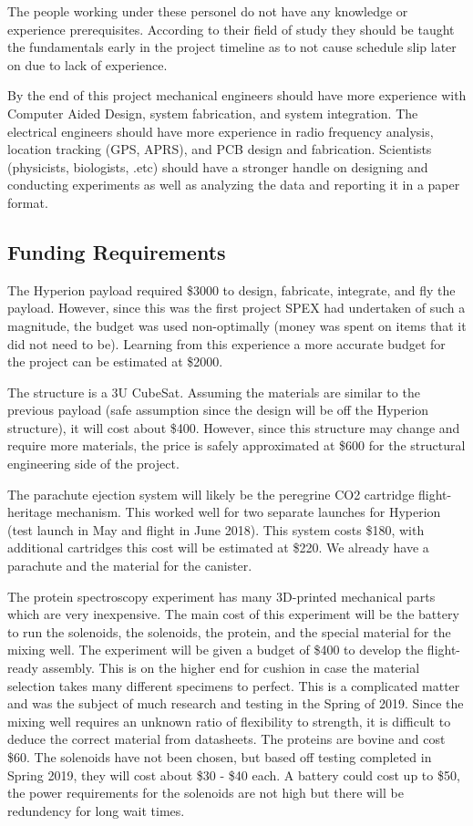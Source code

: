 \documentclass[conference]{IEEEtran} %
\begin{document}
The people working under these personel do not have any knowledge or experience prerequisites. According to their field of study they should be taught the fundamentals early in the project 
timeline as to not cause schedule slip later on due to lack of experience. 

By the end of this project mechanical engineers should have more experience with Computer Aided Design, system fabrication, and system integration. The electrical engineers should have more 
experience in radio frequency analysis, location tracking (GPS, APRS), and PCB design and fabrication. Scientists (physicists, biologists, .etc) should have a stronger handle on designing and conducting 
experiments as well as analyzing the data and reporting it in a paper format. 

\subsection{Funding Requirements}
The Hyperion payload required \$3000 to design, fabricate, integrate, and fly the payload. However, since this was the first project SPEX had undertaken of such a magnitude, the budget was 
used non-optimally (money was spent on items that it did not need to be). Learning from this experience a more accurate budget for the project can be estimated at \$2000. 

The structure is a 3U CubeSat. Assuming the materials are similar to the previous payload (safe assumption since the design will be off the Hyperion structure), it will cost about \$400. 
However, since this structure may change and require more materials, the price is safely approximated at \$600 for the structural engineering side of the project. 

The parachute ejection system will likely be the peregrine CO2 cartridge flight-heritage mechanism. This worked well for two separate launches for Hyperion (test launch in May and flight in June 2018). 
This system costs \$180, with additional cartridges this cost will be estimated at \$220. We already have a parachute and the material for the canister. 

The protein spectroscopy experiment has many 3D-printed mechanical parts which are very inexpensive. The main cost of this experiment will be the battery to run the solenoids, the solenoids, 
the protein, and the special material for the mixing well. The experiment will be given a budget of \$400 to develop the flight-ready assembly. This is on the higher end for cushion in case 
the material selection takes many different specimens to perfect. This is a complicated matter and was the subject of much research and testing in the Spring of 2019. Since the mixing well 
requires an unknown ratio of flexibility to strength, it is difficult to deduce the correct material from datasheets. The proteins are bovine and cost \$60. The solenoids have not been 
chosen, but based off testing completed in Spring 2019, they will cost about \$30 - \$40 each. A battery could cost up to \$50, the power requirements for the solenoids are not high but there 
will be redundency for long wait times. 
\end{document}
